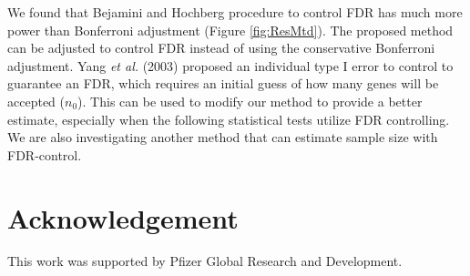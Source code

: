 \documentclass{bioinfo}
\begin{document}
We found that Bejamini and Hochberg procedure to control FDR has
much more power than Bonferroni adjustment (Figure
\ref{fig:ResMtd}). The proposed method can be adjusted to control
FDR instead of using the conservative Bonferroni adjustment. Yang
\textit{et al.} (2003) proposed an individual type I error to
control to guarantee an FDR, which requires an initial guess of
how many genes will be accepted ($n_0$). This can be used to
modify our method to provide a better estimate, especially when
the following statistical tests utilize FDR controlling. We are
also investigating another method that can estimate sample size
with FDR-control.


\section*{Acknowledgement}
This work was supported by Pfizer Global Research and Development.
\end{document}
